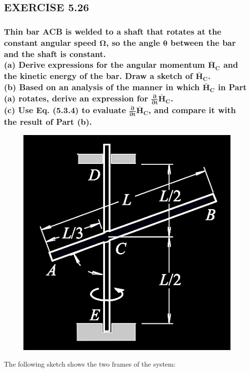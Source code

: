 \documentclass[12pt, letterpaper]{../assignment}
\begin{document}
\subsection*{EXERCISE 5.26}
\subsubsection*{Thin bar ACB is welded to a shaft that rotates at the constant angular speed $\bm{\Omega}$,
so the angle $\bm{\theta}$ between the bar and the shaft is constant.\\
(a) Derive expressions for the angular momentum $\bm{\bar{H}_C}$ and the kinetic energy of the bar.
Draw a sketch of $\bm{\bar{H}_C}$.\\
(b) Based on an analysis of the manner in which $\bm{\bar{H}_C}$ in Part (a) rotates,
derive an expression for $\bm{\frac{\partial}{\partial t}\bar{H}_C}$.\\
(c) Use Eq. (5.3.4) to evaluate $\bm{\frac{\partial}{\partial t}\bar{H}_C}$,
and compare it with the result of Part (b).}

\begin{figure}[H]
    \centering
    \includegraphics[scale=0.7,frame]{images/Q5_26.png}
\end{figure}

The following sketch shows the two frames of the system:
\end{document}
